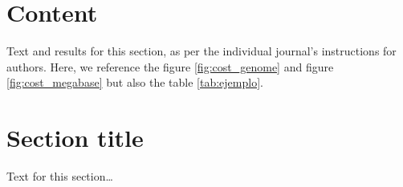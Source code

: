 \documentclass{bmcart}
\begin{document}
\begin{frontmatter}
\begin{abstractbox}
\begin{abstract}
			
			\end{abstract}
			
			
			\begin{keyword}
			\end{keyword}
		
		
		\end{abstractbox}
	
	\end{frontmatter}
	
	
	\section*{Content}
		Text and results for this section, as per the individual journal's instructions for authors. Here, we reference the figure \ref{fig:cost_genome} and figure \ref{fig:cost_megabase} but also the table \ref{tab:ejemplo}.
	
	\section*{Section title}
		Text for this section\ldots
\end{document}
